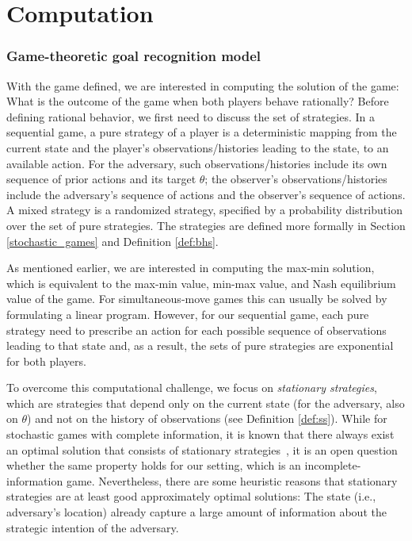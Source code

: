 %
%
\chapter{Computation}

\subsection{Game-theoretic goal recognition model}

With the game defined, we are interested in computing the solution of the game: 
What is the outcome of the game when both players behave rationally? 
Before defining rational behavior, we first need to discuss the set of strategies. In a sequential game, 
a pure strategy of a player is a deterministic mapping from the
current state and the player's observations/histories leading to the state, to an available action. For the adversary, such observations/histories include its own sequence 
of prior actions and its target $\theta$; 
the observer's observations/histories include 
the adversary's sequence of actions and the observer's sequence of actions.
A mixed strategy is a randomized strategy, specified by a probability distribution over the set of pure strategies.
The strategies are defined more formally in Section \ref{stochastic_games} and Definition \ref{def:bhs}.   

As mentioned earlier, we are interested in computing the max-min solution, 
which is equivalent to the max-min value, min-max value, and Nash equilibrium value  of the game. 
For simultaneous-move games this can usually be solved by formulating a linear program. 
However, for our sequential game, each pure strategy need to prescribe an action for each possible sequence of observations leading to that state and, as a result, the sets of pure strategies are exponential for both players. 

To overcome this computational challenge, we focus on \emph{stationary strategies}, 
which are strategies that depend only on the current 
state (for the adversary, also on $\theta$) and not on the history of observations (see Definition \ref{def:ss}).
While for stochastic games with complete information, it is known that there always exist an optimal solution that consists of stationary strategies~\cite{fudenberg1991game},
 it is an open question whether the same property holds for our setting, which is an incomplete-information game.
Nevertheless, there are some heuristic reasons
that stationary strategies are at least good approximately optimal solutions: The state (i.e., adversary's location) already capture a large amount of information about the strategic intention of the adversary.

